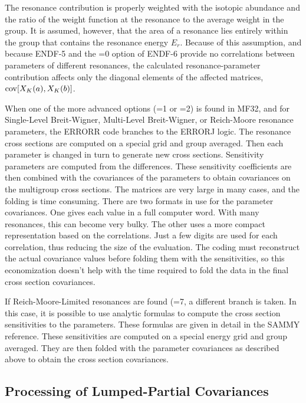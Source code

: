 The resonance contribution is properly weighted with the isotopic
abundance and the ratio of the weight function at the resonance to the
average weight in the group.  It is assumed, however, that the area of
a resonance lies entirely within the group that contains the resonance
energy $E_r$.  Because of this assumption, and because ENDF-5 and the
=0 option of ENDF-6 provide no correlations between
parameters of different resonances, the calculated resonance-parameter
contribution affects only the diagonal elements of the affected
matrices, ${\rm cov}[X_K(a),X_K(b)]$.

When one of the more advanced options (=1 or
=2) is found in MF32, and for Single-Level
Breit-Wigner,
Multi-Level Breit-Wigner,
or Reich-Moore resonance parameters, the
ERRORR code branches to the ERRORJ logic.  The resonance
cross sections are computed on a special grid and group averaged.  Then
each parameter is changed in turn to generate new cross sections.
Sensitivity parameters are computed from the differences.  These
sensitivity coefficients are then combined with the covariances of
the parameters to obtain covariances on the multigroup cross sections.
The matrices are very large in many cases, and the folding is
time consuming.  There are two formats in use for the parameter
covariances.  One gives each value in a full computer word.  With
many resonances, this can become very bulky.  The other uses a
more compact representation based on the correlations.  Just a few
digits are used for each correlation, thus reducing the size of
the evaluation.  The coding must reconstruct the actual covariance
values before folding them with the sensitivities, so this
economization doesn't help with the time required to fold the
data in the final cross section covariances.

If Reich-Moore-Limited resonances
are found (=7, a different branch is taken.  In this case,
it is possible to use analytic formulas to compute the cross section
sensitivities to the parameters.  These formulas are given in detail
in the SAMMY reference\cite{SAMMY}.  These sensitivities are computed
on a special energy grid and group averaged.  They are then folded
with the parameter covariances as described above to obtain the
cross section covariances.


\subsection{Processing of Lumped-Partial Covariances}
\label{ssERRORR_Lump}

